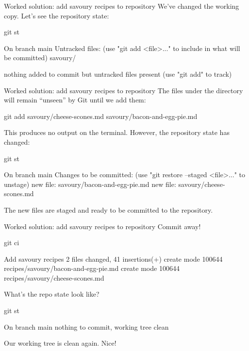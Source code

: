 \documentclass{git_course}
\begin{document}
\begin{frame}[fragile]{Worked solution: add savoury recipes to repository}
    We've changed the working copy.  Let's see the repository state:
    \begin{shellcode}
        git st
    \end{shellcode}
    \begin{outputcode}
On branch main
Untracked files:
  (use "git add <file>..." to include in what will be committed)
        savoury/

nothing added to commit but untracked files present (use "git add" to track)
    \end{outputcode}
\end{frame}

\begin{frame}[fragile]{Worked solution: add savoury recipes to repository}
    The files under the  directory will remain ``unseen'' by
    Git until we add them:
    \begin{shellcode}
        git add savoury/cheese-scones.md savoury/bacon-and-egg-pie.md
    \end{shellcode}

    This produces no output on the terminal.  However, the repository state
    has changed:
    \begin{shellcode}
        git st
    \end{shellcode}
    \begin{outputcode}
On branch main
Changes to be committed:
  (use "git restore --staged <file>..." to unstage)
        new file:   savoury/bacon-and-egg-pie.md
        new file:   savoury/cheese-scones.md
    \end{outputcode}

    The new files are staged and ready to be committed to the repository.
\end{frame}

\begin{frame}[fragile]{Worked solution: add savoury recipes to repository}
    Commit away!
    \begin{shellcode}
        git ci
    \end{shellcode}
    \begin{outputcode}
[main 586c856] Add savoury recipes
 2 files changed, 41 insertions(+)
 create mode 100644 recipes/savoury/bacon-and-egg-pie.md
 create mode 100644 recipes/savoury/cheese-scones.md
    \end{outputcode}

    What's the repo state look like?
    \begin{shellcode}
        git st
    \end{shellcode}
    \begin{outputcode}
On branch main
nothing to commit, working tree clean
    \end{outputcode}
    Our working tree is clean again.  Nice!
\end{frame}
\end{document}
